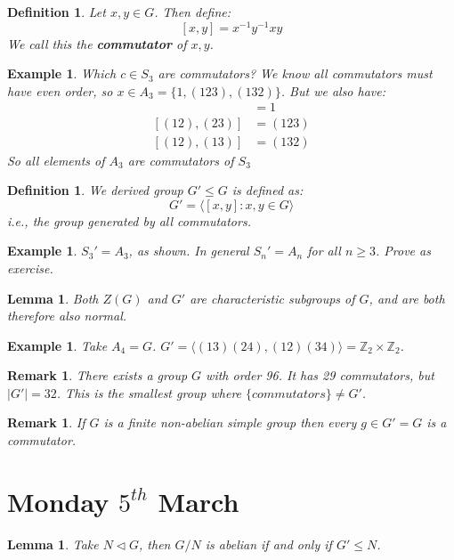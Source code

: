 \documentclass[a4paper,10pt]{article}
\newcommand{\ZZ}{\mathbb{Z}}
\newtheorem{Def}[thm]{Definition}
\newtheorem{eg}[thm]{Example}
\newtheorem{Lem}[thm]{Lemma}
\newtheorem{rem}[thm]{Remark}
\begin{document}
\begin{Def}
Let $x,y \in G$. Then define:
\[ [x,y] = x^{-1} y^{-1} xy \]
We call this the \textbf{commutator} of $x,y$. 
\end{Def}
\begin{eg}
Which $c \in S_3$ are commutators? We know all commutators must have even order, so $x \in A_3 = \{ 1, (123), (132) \}$. But we also have:
\begin{align*}
[(12), (12)] &= 1 \\
[(12), (23)] &= (123) \\
[(12), (13)] &= (132)
\end{align*}
So all elements of $A_3$ are commutators of $S_3$
\end{eg}
\begin{Def}
We derived group $G' \leq G$ is defined as:
\[ G' = \langle [x,y] : x,y \in G \rangle \]
i.e., the group generated by all commutators. 
\end{Def}
\begin{eg}
$S_3 ' = A_3$, as shown. In general $S_n ' = A_n$ for all $n \geq 3$. Prove as exercise.
\end{eg}

\begin{Lem}
Both $Z(G)$ and $G'$ are characteristic subgroups of $G$, and are both therefore also normal. 
\end{Lem}


\begin{eg}
Take $A_4 = G$. $G' = \langle (13)(24), (12)(34) \rangle = \ZZ_2 \times \ZZ_2$.
\end{eg}

\begin{rem}
There exists a group $G$ with order 96. It has 29 commutators, but $|G'| = 32$. This is the smallest group where $\{commutators\} \neq G'$.
\end{rem}
\begin{rem}
If $G$ is a finite non-abelian simple group then every $g \in G' = G$ is a commutator.
\end{rem}


\newpage
\section{Monday $5^{th}$ March}

\begin{Lem}
Take $N \triangleleft G$, then $G / N$ is abelian if and only if  $G' \leq N$. 
\end{Lem}
\end{document}
